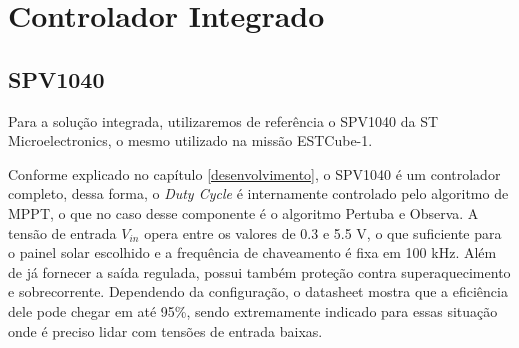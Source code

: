 
% 








\section{Controlador Integrado}

\subsection*{SPV1040}

Para a solução integrada, utilizaremos de referência o SPV1040 \cite{spv1040_datasheet} da ST Microelectronics, o mesmo utilizado na missão ESTCube-1. 

Conforme explicado no capítulo \ref{desenvolvimento}, o SPV1040 é um controlador completo, dessa forma, o \textit{Duty Cycle} é internamente controlado pelo algoritmo de MPPT, o que no caso desse componente é o algoritmo Pertuba e Observa. A tensão de entrada $V_{in}$ opera entre os valores de 0.3 e 5.5 V, o que suficiente para o painel solar escolhido e a frequência de chaveamento é fixa em 100 kHz. Além de já fornecer a saída regulada, possui também proteção contra superaquecimento e sobrecorrente. Dependendo da configuração, o datasheet mostra que a eficiência dele pode chegar em até 95\%, sendo extremamente indicado para essas situação onde é preciso lidar com tensões de entrada baixas. 

